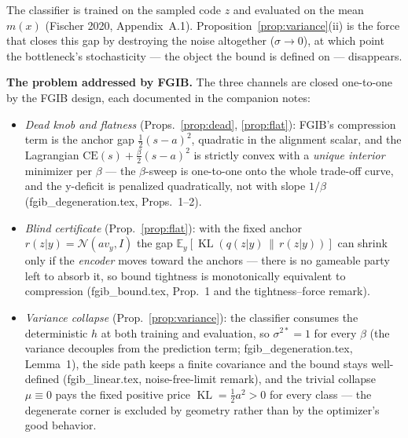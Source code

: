 \begin{remark}\label{rem:mismatch}
The classifier is trained on the sampled code $z$ and evaluated on the mean $m(x)$
(Fischer 2020, Appendix~A.1). Proposition~\ref{prop:variance}(ii) is the force that
closes this gap by destroying the noise altogether ($\sigma \to 0$), at which point the
bottleneck's stochasticity --- the object the bound is defined on --- disappears.
\end{remark}

\textbf{The problem addressed by FGIB.}
The three channels are closed one-to-one by the FGIB design, each documented in the
companion notes:
\begin{itemize}
\item \emph{Dead knob and flatness} (Props.~\ref{prop:dead}, \ref{prop:flat}): FGIB's
compression term is the anchor gap $\tfrac12(s-a)^2$, quadratic in the alignment scalar,
and the Lagrangian $\mathrm{CE}(s) + \tfrac{\beta}{2}(s-a)^2$ is strictly convex with a
\emph{unique interior} minimizer per $\beta$ --- the $\beta$-sweep is one-to-one onto the
whole trade-off curve, and the y-deficit is penalized quadratically, not with slope
$1/\beta$ (fgib\_degeneration.tex, Props.~1--2).
\item \emph{Blind certificate} (Prop.~\ref{prop:flat}): with the fixed anchor
$r(z|y) = \mathcal{N}(a v_y, I)$ the gap
$\mathbb{E}_y[\operatorname{KL}(q(z|y)\,\|\,r(z|y))]$ can shrink only if the
\emph{encoder} moves toward the anchors --- there is no gameable party left to absorb it,
so bound tightness is monotonically equivalent to compression (fgib\_bound.tex, Prop.~1
and the tightness--force remark).
\item \emph{Variance collapse} (Prop.~\ref{prop:variance}): the classifier consumes the
deterministic $h$ at both training and evaluation, so $\sigma^{2*} = 1$ for every $\beta$
(the variance decouples from the prediction term; fgib\_degeneration.tex, Lemma~1), the
side path keeps a finite covariance and the bound stays well-defined
(fgib\_linear.tex, noise-free-limit remark), and the trivial collapse $\mu \equiv 0$ pays
the fixed positive price $\operatorname{KL} = \tfrac12 a^2 > 0$ for every class --- the
degenerate corner is excluded by geometry rather than by the optimizer's good behavior.
\end{itemize}

